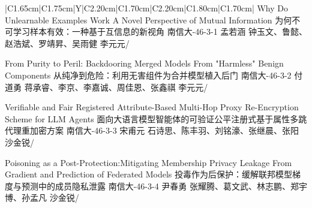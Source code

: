\Needspace{7.5cm}
\begin{tabularx}{\textwidth}{|C{1.65cm}|C{1.75cm}|Y|C{2.20cm}|C{1.70cm}|C{2.20cm}|C{1.80cm}|C{1.70cm}|}
\HeaderRow
{}
{Why Do Unlearnable Examples Work A Novel Perspective of Mutual Information \newline 为何不可学习样本有效：一种基于互信息的新视角}
{南信大-46-3-1}
{孟若涵}
{钟玉文、鲁懿、赵浩斌、罗靖昇、吴雨健}
{李元元}{/}

{From Purity to Peril: Backdooring Merged Models From "Harmless" Benign Components \newline
从纯净到危险：利用无害组件为合并模型植入后门 }
{南信大-46-3-2}
{付道勇}
{蒋承睿、李京、李嘉诚、周佳恩、张鑫祺}
{李元元}{/}


{Verifiable and Fair Registered Attribute-Based Multi-Hop Proxy Re-Encryption Scheme for LLM Agents \newline 
面向大语言模型智能体的可验证公平注册式基于属性多跳代理重加密方案}
{南信大-46-3-3}
{宋甫元}
{石诗思、陈丰羽、刘铭濠、张继晨、张阳}
{沙金锐}{/}

{Poisoning as a Post-Protection:Mitigating Membership Privacy Leakage From Gradient and Prediction of Federated Models\newline  
投毒作为后保护：缓解联邦模型梯度与预测中的成员隐私泄露 }
{南信大-46-3-4}
{尹春勇}
{张耀腾、葛文武、林志鹏、郑宇博、孙孟凡}
{沙金锐}{/}
\end{tabularx}
\BlockGap






